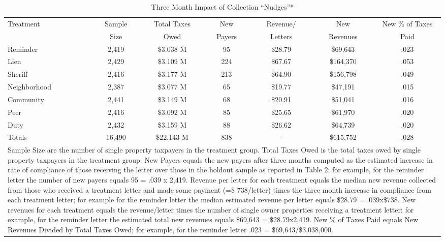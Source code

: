 \documentclass[12pt]{article}
\begin{document}
\begin{table}[htbp]
\centering
\caption{Three Month Impact of Collection ``Nudges''*}
\label{sh_rev}
\begin{tabular}{lcccccc}
  \hline
Treatment & Sample & Total Taxes & New  & Revenue/ & New  & New \% of Taxes
\\
& Size & Owed & Payers & Letters & Revenues & Paid\\
\hline
Reminder & 2,419 & \$3.038 M & 95 & \$28.79 & \$69,643 & .023\\
  Lien & 2,429 & \$3.109 M & 224 & \$67.67 & \$164,370 & .053 \\
  Sheriff & 2,416 & \$3.177 M & 213 & \$64.90 & \$156,798 & .049 \\
Neighborhood & 2,387 & \$3.077 M & 65 & \$19.77 & \$47,191 & .015 \\
  Community & 2,441 & \$3.149 M & 68 & \$20.91 & \$51,041 & .016\\
  Peer & 2,416 & \$3.092 M & 85 & \$25.65 & \$61,970 & .020\\
  Duty & 2,432 & \$3.159 M & 88 & \$26.62 & \$64,739 & .020\\
   \hline
  Totals & 16,490 & \$22.143 M & 838 & - & \$615,752 & .028\\
  \hline
\multicolumn{7}{p{1\textwidth}}{\scriptsize* Sample Size are the
  number of single property taxpayers in the treatment group.  Total
  Taxes Owed is the total taxes owed by single property taxpayers in
  the treatment group. New Payers equals the new payers after three
  months computed as the estimated increase in rate of compliance of
  those receiving the letter over those in the holdout sample as
  reported in Table 2; for example, for the reminder letter the number
  of new payers equals 95 = .039 x 2,419.  Revenue per letter for each
  treatment equals the median new revenue collected from those who
  received a treatment letter and made some payment (=\$ 738/letter)
  times the three month increase in compliance from each treatment
  letter; for example for the reminder letter the median estimated
  revenue per letter equals \$28.79 = .039x\$738.  New revenues for
  each treatment equals the revenue/letter times the number of single
  owner properties receiving a treatment letter: for example, for the
  reminder letter the estimated total new revenues equals \$69,643 =
  \$28.79x2,419.  New \% of Taxes Paid equals New Revenues Divided by
  Total Taxes Owed; for example, for the reminder letter .023 =
  \$69,643/\$3,038,000.}
\end{tabular}
\end{table}
\end{document}
